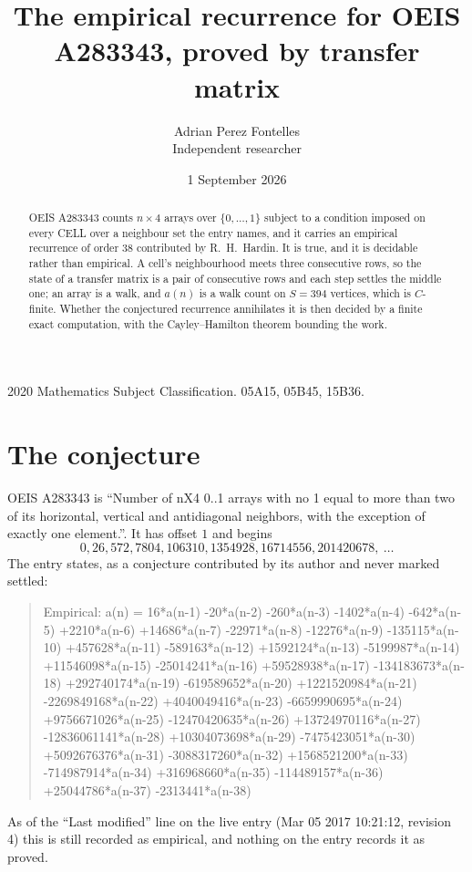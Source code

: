 \documentclass[11pt,a4paper]{article}
\title{The empirical recurrence for OEIS A283343, proved by transfer matrix}
\author{Adrian Perez Fontelles\\ \small Independent researcher}
\date{1 September 2026}
\theoremstyle{plain}
\theoremstyle{definition}
\begin{document}
\maketitle

\begin{abstract}
OEIS A283343 counts $n\times4$ arrays over $\{0,\dots,1\}$ subject to a condition imposed on
every CELL over a neighbour set the entry names, and it carries an empirical recurrence of
order $38$ contributed by R.~H.~Hardin. It is true, and it is decidable rather than
empirical. A cell's neighbourhood meets three consecutive rows, so the state of a transfer
matrix is a pair of consecutive rows and each step settles the middle one; an array is a
walk, and $a(n)$ is a walk count on $S=394$ vertices, which is $C$-finite. Whether the
conjectured recurrence annihilates it is then decided by a finite exact computation, with the
Cayley--Hamilton theorem bounding the work.
\end{abstract}

\noindent\small 2020 Mathematics Subject Classification. 05A15, 05B45, 15B36.\normalsize

\section{The conjecture}

OEIS A283343 is ``Number of nX4 0..1 arrays with no 1 equal to more than two of its horizontal, vertical and antidiagonal neighbors, with the exception of exactly one element.''. It has offset $1$ and begins
\[
0, 26, 572, 7804, 106310, 1354928, 16714556, 201420678,\ \dots
\]
The entry states, as a conjecture contributed by its author and never marked settled:
\begin{quote}
Empirical: a(n) = 16*a(n-1) -20*a(n-2) -260*a(n-3) -1402*a(n-4) -642*a(n-5) +2210*a(n-6) +14686*a(n-7) -22971*a(n-8) -12276*a(n-9) -135115*a(n-10) +457628*a(n-11) -589163*a(n-12) +1592124*a(n-13) -5199987*a(n-14) +11546098*a(n-15) -25014241*a(n-16) +59528938*a(n-17) -134183673*a(n-18) +292740174*a(n-19) -619589652*a(n-20) +1221520984*a(n-21) -2269849168*a(n-22) +4040049416*a(n-23) -6659990695*a(n-24) +9756671026*a(n-25) -12470420635*a(n-26) +13724970116*a(n-27) -12836061141*a(n-28) +10304073698*a(n-29) -7475423051*a(n-30) +5092676376*a(n-31) -3088317260*a(n-32) +1568521200*a(n-33) -714987914*a(n-34) +316968660*a(n-35) -114489157*a(n-36) +25044786*a(n-37) -2313441*a(n-38)
\end{quote}
As of the ``Last modified'' line on the live entry (Mar 05 2017 10:21:12, revision 4) this is still
recorded as empirical, and nothing on the entry records it as proved.
\end{document}
